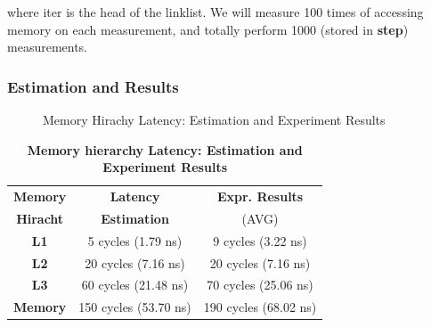 where iter is the head of the linklist. We will measure 100 times of accessing memory on each measurement, and totally perform 1000 (stored in \textbf{step}) measurements.

\subsubsection{Estimation and Results}

\begin{figure}[ht]
    \centering
    \caption{Memory Hirachy Latency: Estimation and Experiment Results }
    \label{mem_latency_result}
\end{figure}

\begin{table}[ht]
  \centering
  \caption{\textbf{Memory hierarchy Latency: Estimation and Experiment Results}}
  \begin{threeparttable}
  \begin{tabular}{ccc}
  \hline
      \textbf{Memory}    & \textbf{Latency}   & \textbf{Expr. Results} \\
      \textbf{Hiracht}   & \textbf{Estimation}  & (AVG)   \\
  \hline
      \textbf{L1}  & 5 cycles (1.79 ns) & 9 cycles (3.22 ns)   \\
      \textbf{L2}  & 20 cycles (7.16 ns) & 20 cycles (7.16 ns)  \\
      \textbf{L3}  & 60 cycles (21.48 ns) & 70 cycles (25.06 ns)  \\
      \textbf{Memory}  & 150 cycles (53.70 ns)  & 190 cycles (68.02 ns)  \\
  \hline
  \end{tabular}
  \end{threeparttable}
  \label{memory_latency_table}
\end{table}

